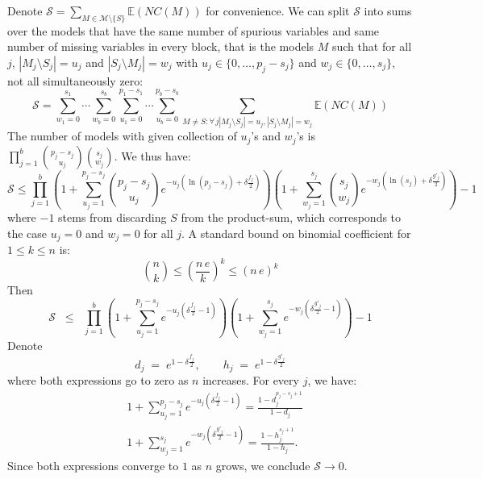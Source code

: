 \documentclass[aos]{imsart}
\theoremstyle{plain}
\newcommand{\E}{\mathbb{E}}
\newcommand{\M}{\mathcal{M}}
\begin{document}
Denote $\mathcal{S}= \sum_{M \in \M\setminus \{S\}} \E\left(NC(M)\right)$ for convenience. We can split $\mathcal{S}$ into sums over the models that have the same number of spurious variables and same number of missing variables in every block, that is the models $M$ such that for all $j$, $|M_j\setminus S_j|=u_j$ and $|S_j\setminus M_j|=w_j$ with $u_j \in \{0,\ldots,p_j-s_j\}$ and $w_j \in \{0,\ldots,s_j\}$, not all simultaneously zero:
$$\mathcal{S} =\sum_{w_1=0}^{s_1}\cdots\sum_{w_b=0}^{s_b}\sum_{u_1=0}^{p_1-s_1}\cdots\sum_{u_b=0}^{p_b-s_b}\sum_{M \neq S:\forall \,j |M_j\setminus S_j|=u_j, |S_j\setminus M_j|=w_j } \E\left(NC(M)\right)$$
The number of models with given collection of $u_j$'s and $w_j$'s is $\prod_{j=1}^b {\binom{p_j-s_j}{u_j}}{\binom{s_j}{w_j}}$. We thus have:
\begin{equation*}
    \mathcal{S} \leq \prod_{j=1}^b\left(1+\sum_{u_j=1}^{p_j-s_j}{\binom{p_j-s_j}{u_j}}e^{- u_j(\ln(p_j-s_j)+\delta \tfrac{f_j}{2})}\right)\left(1+
    \sum_{w_j=1}^{s_j}{\binom{s_j}{w_j}}
    e^{-w_j(\ln(s_j)+\delta \tfrac{g'_j}{2})}\right) - 1
\end{equation*}
where $-1$ stems from discarding $S$ from the product-sum, which corresponds to the case $u_j=0$ and $w_j=0$ for all $j$. A standard bound on binomial coefficient for $1\leq k\leq n$ is:
\begin{equation*}
    \binom{n}{k} \leq \left(\frac{n\,e}{k}\right)^k \leq \left(n\,e\right)^k
\end{equation*}
Then
\begin{equation*}
    \mathcal{S} \;\;\leq\;\; \prod_{j=1}^b\left(1+\sum_{u_j=1}^{p_j-s_j}e^{-u_j\left(\delta \tfrac{f_j}{2}-1\right)}\right)\left(1+
    \sum_{w_j=1}^{s_j}    e^{-w_j\left(\delta \tfrac{g'_j}{2}-1\right)}\right) - 1
\end{equation*}
Denote
$$
d_j\;=\;e^{1-\delta \tfrac{f_j}{2}},\qquad h_j\;=\;e^{1-\delta \tfrac{g'_j}{2}}
$$
where both expressions go to zero as $n$ increases.
For every $j$, we have:
\begin{eqnarray*}
    &1+\sum_{u_j=1}^{p_j-s_j}e^{-u_j\left(\delta \tfrac{f_j}{2}-1\right)}
    =\frac{1-d_j^{p_j-s_j+1}}{1-d_j} \\
    &1+\sum_{w_j=1}^{s_j}    e^{-w_j\left(\delta \tfrac{g'_j}{2}-1\right)} =\frac{1-h_j^{s_j+1}}{1-h_j}.
\end{eqnarray*}
Since both expressions converge to $1$ as $n$ grows, we conclude $\mathcal S\to 0$.
\end{document}
